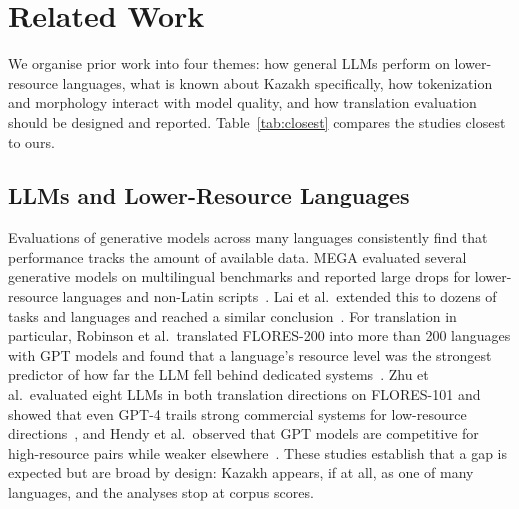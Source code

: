 \section{Related Work}
\label{sec:related}

We organise prior work into four themes: how general LLMs perform on lower-resource languages, what is known about Kazakh specifically, how tokenization and morphology interact with model quality, and how translation evaluation should be designed and reported. Table~\ref{tab:closest} compares the studies closest to ours.

\subsection{LLMs and Lower-Resource Languages}
Evaluations of generative models across many languages consistently find that performance tracks the amount of available data. MEGA evaluated several generative models on multilingual benchmarks and reported large drops for lower-resource languages and non-Latin scripts~\cite{ahuja2023mega}. Lai et al.\ extended this to dozens of tasks and languages and reached a similar conclusion~\cite{lai2023beyond}. For translation in particular, Robinson et al.\ translated FLORES-200 into more than 200 languages with GPT models and found that a language's resource level was the strongest predictor of how far the LLM fell behind dedicated systems~\cite{robinson2023chatgpt}. Zhu et al.\ evaluated eight LLMs in both translation directions on FLORES-101 and showed that even GPT-4 trails strong commercial systems for low-resource directions~\cite{zhu2024multilingual}, and Hendy et al.\ observed that GPT models are competitive for high-resource pairs while weaker elsewhere~\cite{hendy2023good}. These studies establish that a gap is expected but are broad by design: Kazakh appears, if at all, as one of many languages, and the analyses stop at corpus scores.

